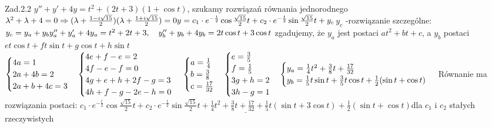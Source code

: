 \documentclass{article}
\begin{document}
Zad.2.2
\newline
\newline
$
y''+y'+4y=t^2+(2t+3)(1+\cos{t})
$, szukamy rozwiązań równania jednorodnego\newline
$
\lambda^2+\lambda+4=0\Rightarrow (\lambda+\frac{1-i\sqrt{15}}{2})(\lambda+\frac{1+i\sqrt{15}}{2})=0\newline
y=c_1\cdot e^{-\frac{t}{2}}\cos{\frac{\sqrt{15}}{2}t}+c_2\cdot e^{-\frac{t}{2}}\sin{\frac{\sqrt{15}}{2}t}+y_c
$\quad $y_c$ -rozwiązanie szczególne:
$
y_c=y_a+y_b\newline y_a''+y_a'+4y_a=t^2+2t+3,\quad y_b''+y_b+4y_b=2t\cos{t}+3\cos{t}
$ zgadujemy, że $y_a$ jest postaci $at^2+bt+c$, a $y_b$ postaci $et\cos{t}+ft\sin{t}+g\cos{t}+h\sin{t}$\quad
$\begin{cases}4a=1\\2a+4b=2\\2a+b+4c=3\end{cases}
\begin{cases}4e+f-e=2\\4f-e-f=0\\4g+e+h+2f-g=3\\4h+f-g-2e-h=0\end{cases}\newline
\begin{cases}a=\frac{1}{4}\\b=\frac{3}{8}\\c=\frac{17}{32}\end{cases}
\begin{cases}e=\frac{3}{5}\\f=\frac{1}{5}\\3g+h=2\\3h-g=1\end{cases}
\begin{cases}y_a=\frac{1}{4}t^2+\frac{3}{8}t+\frac{17}{32}\\y_b=\frac{1}{5}t\sin{t}+\frac{3}{5}t\cos{t}+\frac{1}{2}(\sin{t}+\cos{t})\end{cases}
$
Równanie ma rozwiązania postaci:\newline
$\underline{
c_1\cdot e^{-\frac{t}{2}}\cos{\frac{\sqrt{15}}{2}t}+c_2\cdot e^{-\frac{t}{2}}\sin{\frac{\sqrt{15}}{2}t}+
\frac{1}{4}t^2+\frac{3}{8}t+\frac{17}{32}+\frac{1}{5}t(\sin{t}+3\cos{t})+\frac{1}{2}(\sin{t}+\cos{t})}
$\newline dla $c_1$ i $c_2$ stałych rzeczywistych
\newpage
\end{document}
